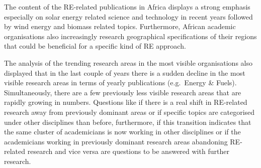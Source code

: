 \documentclass[12pt,twoside]{report}
\begin{document}
The content of the RE-related publications in Africa displays a strong emphasis especially on solar energy related science and technology in recent years followed by wind energy and biomass related topics. Furthermore, African academic organisations also increasingly research geographical specifications of their regions that could be beneficial for a specific kind of RE approach.

The analysis of the trending research areas in the most visible organisations also displayed that in the last couple of years there is a sudden decline in the most visible research areas in terms of yearly publications (e.g.~Energy \& Fuels). Simultaneously, there are a few previously less visible research areas that are rapidly growing in numbers. Questions like if there is a real shift in RE-related research away from previously dominant areas or if specific topics are categorised under other disciplines than before, furthermore, if this transition indicates that the same cluster of academicians is now working in other disciplines or if the academicians working in previously dominant research areas abandoning RE-related research and vice versa are questions to be answered with further research.
\end{document}
